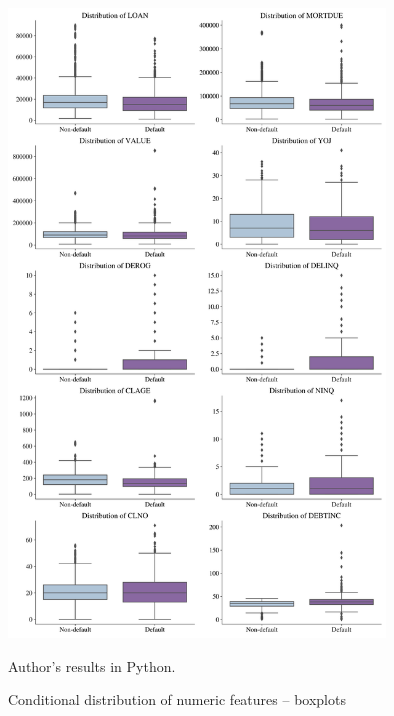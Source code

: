 \begin{figure}[H]
    \begin{center}
    \caption{Conditional distribution of numeric features -- boxplots}
    \label{fig:boxfeat}
    \includegraphics[width=100mm]{Figures/Continuous_Features_Distribution_Boxplots.jpg}
\end{center}
\begin{center}
    \begin{source}Author's results in Python.\end{source}
    \end{center}
\end{figure}

